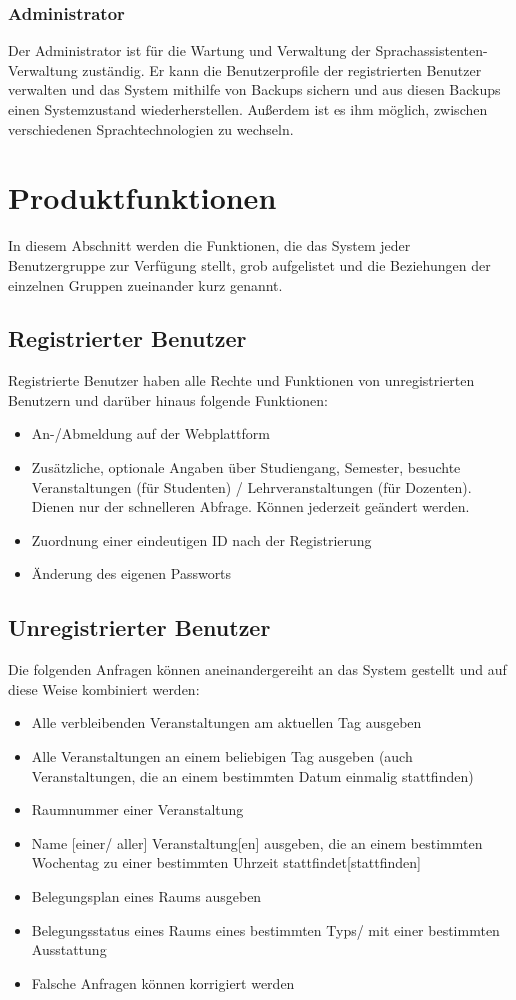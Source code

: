 \documentclass[12pt, a4paper]{scrartcl}
\begin{document}
\subsubsection{Administrator}
Der Administrator ist für die Wartung und Verwaltung der Sprachassistenten-Verwaltung zuständig. Er kann die Benutzerprofile der registrierten Benutzer verwalten und das System mithilfe von Backups sichern und aus diesen Backups einen Systemzustand wiederherstellen. Außerdem ist es ihm möglich, zwischen verschiedenen Sprachtechnologien zu wechseln.

\newpage

\section{Produktfunktionen}
In diesem Abschnitt werden die Funktionen, die das System jeder Benutzergruppe zur Verfügung stellt, grob aufgelistet und die Beziehungen der einzelnen Gruppen zueinander kurz genannt.

\subsection{Registrierter Benutzer}
Registrierte Benutzer haben alle Rechte und Funktionen von unregistrierten Benutzern und darüber hinaus folgende Funktionen:
\begin{itemize}
	\item An-/Abmeldung auf der Webplattform
	\item Zusätzliche, optionale Angaben über Studiengang, Semester, besuchte Veranstaltungen (für Studenten) / Lehrveranstaltungen (für Dozenten). Dienen nur der schnelleren Abfrage. Können jederzeit geändert werden.
	\item Zuordnung einer eindeutigen ID nach der Registrierung
	\item Änderung des eigenen Passworts
\end{itemize}
\subsection{Unregistrierter Benutzer}
 Die folgenden Anfragen können aneinandergereiht an das System gestellt und auf diese Weise kombiniert werden:
\begin{itemize}
	\item Alle verbleibenden Veranstaltungen am aktuellen Tag ausgeben
	\item Alle Veranstaltungen an einem beliebigen Tag ausgeben (auch Veranstaltungen, die an einem bestimmten Datum einmalig stattfinden)
	\item Raumnummer einer Veranstaltung
	\item Name [einer/ aller] Veranstaltung[en] ausgeben, die an einem bestimmten Wochentag zu einer bestimmten Uhrzeit stattfindet[stattfinden]
	\item Belegungsplan eines Raums ausgeben
	\item Belegungsstatus eines Raums eines bestimmten Typs/ mit einer bestimmten Ausstattung
	\item Falsche Anfragen können korrigiert werden
\end{itemize}
\end{document}
